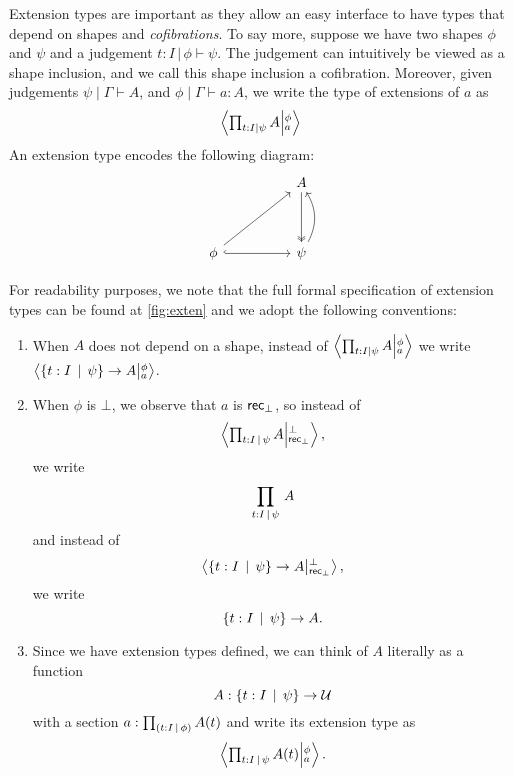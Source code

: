 \documentclass[main.tex]{subfiles}
\begin{document}
Extension types are important as they allow an easy interface to have types that depend on shapes and \textit{cofibrations}. To say more, suppose we have two shapes
 $\phi$ and $\psi$ and a judgement $ t : I \,| \,\phi \vdash \psi$. The judgement can intuitively be viewed as a shape inclusion, and we call this
  shape inclusion a cofibration. Moreover, given judgements $\psi \mid \Gamma \vdash A$, and $\phi \mid \Gamma \vdash a : A$, we write the type of extensions of $a$ as
\begin{equation}
    \label{eqn:extentype}
    \exten{t : I | \psi}{A}{\phi}{a}
\end{equation}
An extension type encodes the following diagram:
\[\begin{tikzcd}
	&& A \\
	\\
	\phi && \psi
	\arrow[two heads, from=1-3, to=3-3]
	\arrow[from=3-1, to=1-3]
	\arrow[hook, from=3-1, to=3-3]
	\arrow[bend right = 30, from=3-3, to=1-3]
\end{tikzcd}\]
\begin{remark}
For readability purposes, we note that the full formal specification of extension types can be found at \cref{fig:exten} and we adopt the following conventions:
\begin{enumerate}
\item When $A$ does not depend on a shape, instead of $\exten{t : I | \psi}{A}{\phi}{a}$ we write $\left\langle \{\nobreak{{t}}\nobreak : \nobreak {{I}}\,\mid\,{{\psi}}\nobreak\}  \to A \middle|^{\phi}_{a}\right\rangle$.
\item When $\phi$ is $\bot$, we observe that $a$ is $\normalfont \mathsf{rec}_\bot$, so instead of $$\exten{\preshape{t}{I}{\psi}}{A}{\bot}{\recbot},$$ we write $$\prd{\preshape{t}{I}{\psi}}A$$ and instead of $$\left\langle \{\nobreak{{t}}\nobreak : \nobreak {{I}}\,\mid\,{{\psi}}\nobreak\}  \to A \middle|^{\bot}_{\normalfont \mathsf{rec}_\bot}\right\rangle,$$ we write $$\{\nobreak{{t}}\nobreak : \nobreak {{I}}\,\mid\,{{\psi}}\nobreak\}  \to A.$$
\item Since we have extension types defined, we can think of $A$ literally as a function $$A : \{\nobreak{{t}}\nobreak : \nobreak {{I}}\,\mid\,{{\psi}}\nobreak\}  \to \mathcal{U}$$ with a section $a : \prd{\preshape{t}{I}{\phi}}A(t)$ and write its extension type as\linebreak
$$\exten{\preshape{t}{I}{\psi}}{A(t)}{\phi}{a}.$$
\end{enumerate}
\end{remark}
\end{document}

